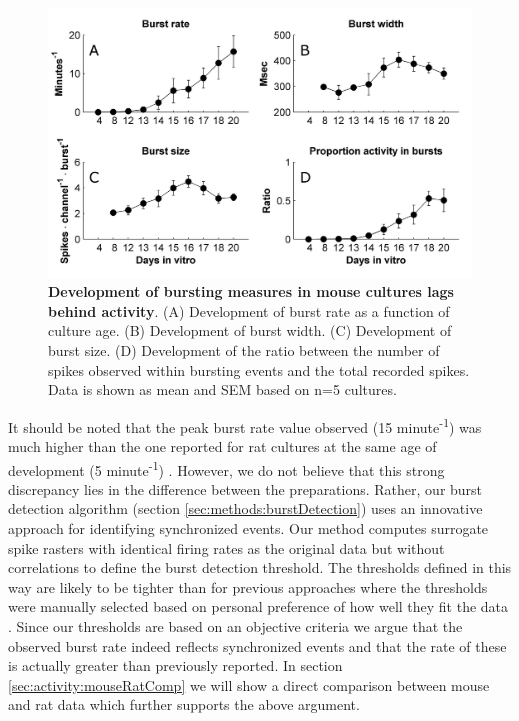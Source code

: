       \begin{figure}[!htb]
            \centering
            \includegraphics[width=15cm]{chapter3/figures/burstMeasures/burstMeasures.jpg}

            \caption[Averaged statistics of development of bursting measures in mouse cultures]{\textbf{Development of bursting measures in mouse cultures lags behind activity}. (A) Development of burst rate as a function of culture age. (B) Development of burst width. (C) Development of burst size. (D) Development of the ratio between the number of spikes observed within bursting events and the total recorded spikes. Data is shown as mean and SEM based on n=5 cultures.}
            \label{fig:activity:burstMeasures}
        \end{figure}

        It should be noted that the peak burst rate value observed (15 minute\textsuperscript{-1}) was much higher than the one reported for rat cultures at the same age of development (5 minute\textsuperscript{-1}) \cite{chiappalone2006dissociated}. However, we do not believe that this strong discrepancy lies in the difference between the preparations. Rather, our burst detection algorithm (section \ref{sec:methods:burstDetection}) uses an innovative approach for identifying synchronized events. Our method computes surrogate spike rasters with identical firing rates as the original data but without correlations to define the burst detection threshold. The thresholds defined in this way are likely to be tighter than for previous approaches where the thresholds were manually selected based on personal preference of how well they fit the data \cite{wagenaar2006extremely,chiappalone2005burst}. Since our thresholds are based on an objective criteria we argue that the observed burst rate indeed reflects synchronized events and that the rate of these is actually greater than previously reported. In section \ref{sec:activity:mouseRatComp} we will show a direct comparison between mouse and rat data which further supports the above argument.

